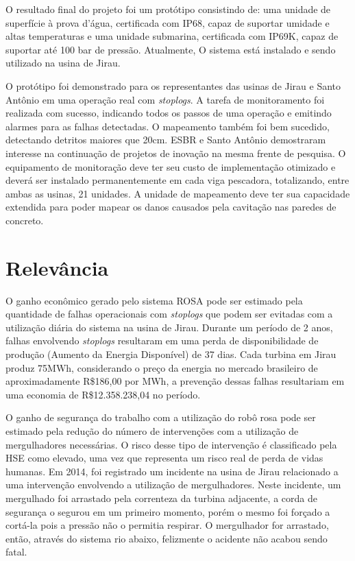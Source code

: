 O resultado final do projeto foi um protótipo consistindo de: uma unidade de
superfície à prova d'água, certificada com IP68, capaz de suportar umidade e
altas temperaturas e uma unidade submarina, certificada com IP69K, capaz de
suportar até 100 bar de pressão. Atualmente, O sistema está instalado e sendo
utilizado na usina de Jirau.

O protótipo foi demonstrado para os representantes das usinas de Jirau e Santo
Antônio em uma operação real com \textit{stoplogs}. A tarefa de monitoramento
foi realizada com sucesso, indicando todos os passos de uma operação e emitindo
alarmes para as falhas detectadas. O mapeamento também foi bem sucedido,
detectando detritos maiores que 20cm. ESBR e Santo Antônio demostraram interesse
na continuação de projetos de inovação na mesma frente de pesquisa. O
equipamento de monitoração deve ter seu custo de implementação otimizado e
deverá ser instalado permanentemente em cada viga pescadora, totalizando, entre
ambas as usinas, 21 unidades. A unidade de mapeamento deve ter sua capacidade
extendida para poder mapear os danos causados pela cavitação nas paredes de
concreto.
 
\section{Relevância}

O ganho econômico gerado pelo sistema ROSA pode ser estimado pela quantidade de
falhas operacionais com \textit{stoplogs} que podem ser evitadas com a
utilização diária do sistema na usina de Jirau. Durante um período de 2 anos,
falhas envolvendo \textit{stoplogs} resultaram em uma perda de disponibilidade
de produção (Aumento da Energia Disponível) de 37 dias. Cada turbina
em Jirau produz 75MWh, considerando o preço da energia no mercado brasileiro de
aproximadamente R\$186,00 por MWh, a prevenção dessas falhas resultariam em uma
economia de R\$12.358.238,04 no período.

O ganho de segurança do trabalho com a utilização do robô rosa pode ser estimado
pela redução do número de intervenções com a utilização de mergulhadores
necessárias. O risco desse tipo de intervenção é classificado pela HSE como
elevado, uma vez que representa um risco real de perda de vidas humanas. Em
2014, foi registrado um incidente na usina de Jirau relacionado a uma
intervenção envolvendo a utilização de mergulhadores. Neste incidente, um
mergulhado foi arrastado pela correnteza da turbina adjacente, a corda de
segurança o segurou em um primeiro momento, porém o mesmo foi forçado a cortá-la
pois a pressão não o permitia respirar. O mergulhador for arrastado, então,
através do sistema rio abaixo, felizmente o acidente não acabou sendo fatal.

